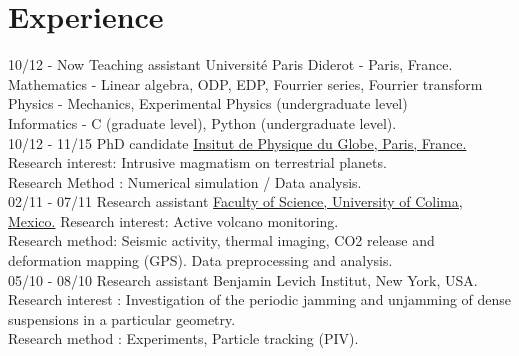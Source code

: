 \documentclass[]{friggeri-cv}
\begin{document}
\section{Experience}
\begin{entrylist}
  \entry
    {10/12 - Now}
    {Teaching assistant}
    {Université Paris Diderot - Paris, France.}
    {Mathematics - Linear algebra, ODP, EDP, Fourrier series, Fourrier transform
    Physics - Mechanics, Experimental Physics (undergraduate level)\\
    Informatics - C (graduate level), Python (undergraduate level).\\}
  \entry
    {10/12 - 11/15}
    {PhD candidate}
    {\href{http://www.ipgp.fr/fr/pss/planetologie-sciences-spatiales}{Insitut de Physique du Globe, Paris, France.}}
    {Research interest: Intrusive magmatism on terrestrial planets. \\
    Research Method : Numerical simulation / Data analysis. \\}
   \entry
    {02/11 - 07/11}
    {Research assistant}
    {\href{http://ciiv.ucol.mx/}{Faculty of Science, University of Colima, Mexico.}}
    {Research interest: Active volcano monitoring. \\
    Research method: Seismic activity, thermal imaging, CO2 release and deformation mapping (GPS). Data preprocessing and analysis.\\}
    \entry
    {05/10 - 08/10}
    {Research assistant}
    {Benjamin Levich Institut, New York, USA.}
    {Research interest : Investigation of the periodic jamming and unjamming of dense suspensions
    in a particular geometry.\\
    Research method : Experiments, Particle tracking (PIV).\\}
\end{entrylist}
\end{document}

